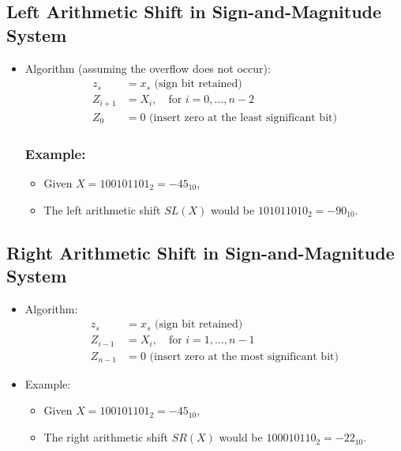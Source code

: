 \documentclass[12pt,openany, tikz,border=10pt]{book}
\begin{document}
	\subsection{Left Arithmetic Shift in Sign-and-Magnitude System}
	
	\begin{itemize}
		\item[] Algorithm (assuming the overflow does not occur):
			  \begin{align*}
				  z_s     & = x_s \text{ (sign bit retained)}                      \\
				  Z_{i+1} & = X_i, \quad \text{for } i = 0, \ldots, n-2            \\
				  Z_0     & = 0 \text{ (insert zero at the least significant bit)} 
			  \end{align*}
			  \subsubsection*{Example:}
			  \begin{itemize}
				  \item[] Given \( X = 100101101_2 = -45_{10} \),
				  \item[] The left arithmetic shift \( SL(X) \) would be \( 101011010_2 = -90_{10} \).
			  \end{itemize}
	\end{itemize}
	
	\subsection{Right Arithmetic Shift in Sign-and-Magnitude System}
	
	\begin{itemize}
		\item[] Algorithm:
			  \begin{align*}
				  z_s     & = x_s \text{ (sign bit retained)}                     \\
				  Z_{i-1} & = X_i, \quad \text{for } i = 1, \ldots, n - 1         \\
				  Z_{n-1} & = 0 \text{ (insert zero at the most significant bit)} 
			  \end{align*}
		\item[] Example:
			  \begin{itemize}
				  \item[] Given \( X = 100101101_2 = -45_{10} \),
				  \item[] The right arithmetic shift \( SR(X) \) would be \( 100010110_2 = -22_{10} \).
			  \end{itemize}
	\end{itemize}
	
\end{document}
